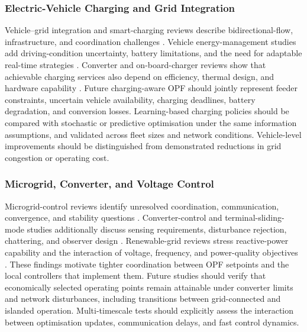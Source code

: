 \documentclass[a4paper,fleqn]{cas-sc}
\begin{document}
\subsubsection{Electric-Vehicle Charging and Grid Integration}\label{subsubsec:gaps_ev}

Vehicle--grid integration and smart-charging reviews describe bidirectional-flow, infrastructure, and coordination challenges \cite{opfRef029,sadeghian2022comprehensive}. Vehicle energy-management studies add driving-condition uncertainty, battery limitations, and the need for adaptable real-time strategies \cite{opfRef028,opfRef048,opfRef063}. Converter and on-board-charger reviews show that achievable charging services also depend on efficiency, thermal design, and hardware capability \cite{safayatullah2022comprehensive,opfRef077}. Future charging-aware OPF should jointly represent feeder constraints, uncertain vehicle availability, charging deadlines, battery degradation, and conversion losses. Learning-based charging policies should be compared with stochastic or predictive optimisation under the same information assumptions, and validated across fleet sizes and network conditions. Vehicle-level improvements should be distinguished from demonstrated reductions in grid congestion or operating cost.

\subsubsection{Microgrid, Converter, and Voltage Control}\label{subsubsec:gaps_microgrid_control}

Microgrid-control reviews identify unresolved coordination, communication, convergence, and stability questions \cite{opfRef030,shirkhani2023review}. Converter-control and terminal-sliding-mode studies additionally discuss sensing requirements, disturbance rejection, chattering, and observer design \cite{opfRef074,opfRef075}. Renewable-grid reviews stress reactive-power capability and the interaction of voltage, frequency, and power-quality objectives \cite{opfRef047,opfRef055}. These findings motivate tighter coordination between OPF setpoints and the local controllers that implement them. Future studies should verify that economically selected operating points remain attainable under converter limits and network disturbances, including transitions between grid-connected and islanded operation. Multi-timescale tests should explicitly assess the interaction between optimisation updates, communication delays, and fast control dynamics.
\end{document}
